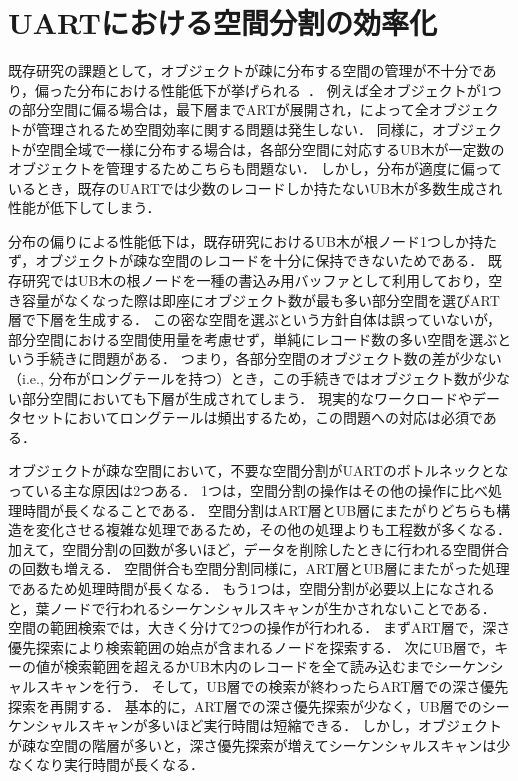 \chapter{UARTにおける空間分割の効率化}

既存研究の課題として，オブジェクトが疎に分布する空間の管理が不十分であり，偏った分布における性能低下が挙げられる~\cite{deim:Suzuki2023}．
例えば全オブジェクトが1つの部分空間に偏る場合は，最下層までARTが展開され，\BTree によって全オブジェクトが管理されるため空間効率に関する問題は発生しない．
同様に，オブジェクトが空間全域で一様に分布する場合は，各部分空間に対応するUB木が一定数のオブジェクトを管理するためこちらも問題ない．
しかし，分布が適度に偏っているとき，既存のUARTでは少数のレコードしか持たないUB木が多数生成され性能が低下してしまう．

分布の偏りによる性能低下は，既存研究におけるUB木が根ノード1つしか持たず，オブジェクトが疎な空間のレコードを十分に保持できないためである．
既存研究ではUB木の根ノードを一種の書込み用バッファとして利用しており，空き容量がなくなった際は即座にオブジェクト数が最も多い部分空間を選びART層で下層を生成する．
この密な空間を選ぶという方針自体は誤っていないが，部分空間における空間使用量を考慮せず，単純にレコード数の多い空間を選ぶという手続きに問題がある．
つまり，各部分空間のオブジェクト数の差が少ない（i.e., 分布がロングテールを持つ）とき，この手続きではオブジェクト数が少ない部分空間においても下層が生成されてしまう．
現実的なワークロードやデータセットにおいてロングテールは頻出するため，この問題への対応は必須である．

オブジェクトが疎な空間において，不要な空間分割がUARTのボトルネックとなっている主な原因は2つある．
1つは，空間分割の操作はその他の操作に比べ処理時間が長くなることである．
空間分割はART層とUB層にまたがりどちらも構造を変化させる複雑な処理であるため，その他の処理よりも工程数が多くなる．
加えて，空間分割の回数が多いほど，データを削除したときに行われる空間併合の回数も増える．
空間併合も空間分割同様に，ART層とUB層にまたがった処理であるため処理時間が長くなる．
もう1つは，空間分割が必要以上になされると，葉ノードで行われるシーケンシャルスキャンが生かされないことである． %
空間の範囲検索では，大きく分けて2つの操作が行われる．
まずART層で，深さ優先探索により検索範囲の始点が含まれるノードを探索する．
次にUB層で，キーの値が検索範囲を超えるかUB木内のレコードを全て読み込むまでシーケンシャルスキャンを行う．
そして，UB層での検索が終わったらART層での深さ優先探索を再開する．
基本的に，ART層での深さ優先探索が少なく，UB層でのシーケンシャルスキャンが多いほど実行時間は短縮できる．
しかし，オブジェクトが疎な空間の階層が多いと，深さ優先探索が増えてシーケンシャルスキャンは少なくなり実行時間が長くなる．

